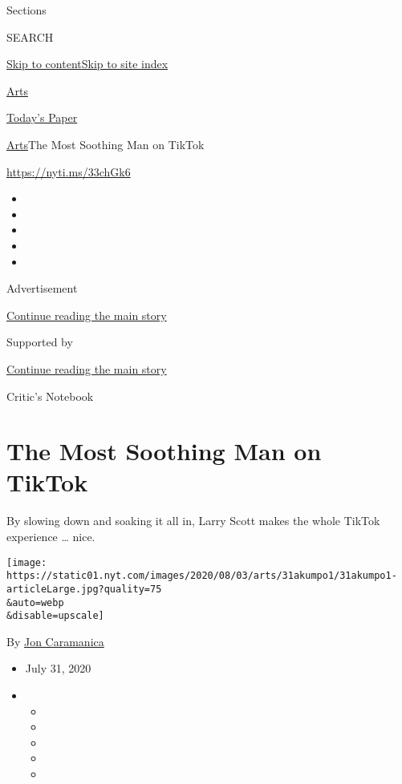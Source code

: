 Sections

SEARCH

\protect\hyperlink{site-content}{Skip to
content}\protect\hyperlink{site-index}{Skip to site index}

\href{https://www.nytimes.com/section/arts}{Arts}

\href{https://myaccount.nytimes.com/auth/login?response_type=cookie\&client_id=vi}{}

\href{https://www.nytimes.com/section/todayspaper}{Today's Paper}

\href{/section/arts}{Arts}\textbar{}The Most Soothing Man on TikTok

\url{https://nyti.ms/33chGk6}

\begin{itemize}
\item
\item
\item
\item
\item
\end{itemize}

Advertisement

\protect\hyperlink{after-top}{Continue reading the main story}

Supported by

\protect\hyperlink{after-sponsor}{Continue reading the main story}

Critic's Notebook

\hypertarget{the-most-soothing-man-on-tiktok}{%
\section{The Most Soothing Man on
TikTok}\label{the-most-soothing-man-on-tiktok}}

By slowing down and soaking it all in, Larry Scott makes the whole
TikTok experience \ldots{} nice.

\texttt{[image: https://static01.nyt.com/images/2020/08/03/arts/31akumpo1/31akumpo1-articleLarge.jpg?quality=75\\\&auto=webp\\\&disable=upscale]}

By \href{https://www.nytimes.com/by/jon-caramanica}{Jon Caramanica}

\begin{itemize}
\item
  July 31, 2020
\item
  \begin{itemize}
  \item
  \item
  \item
  \item
  \item
  \end{itemize}
\end{itemize}


